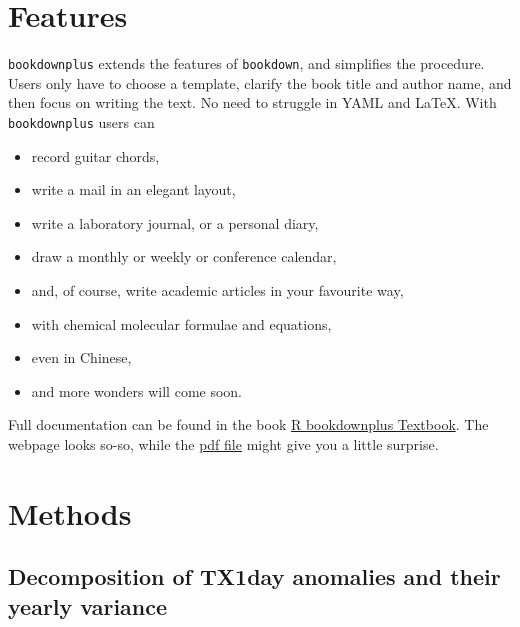 \documentclass[11pt,a4paper,twoside,openright]{report}
\theoremstyle{definition}
\numberwithin{equation}{subsection}
\begin{document}
\hypertarget{features}{%
\chapter{Features}\label{features}}

\texttt{bookdownplus} extends the features of \texttt{bookdown}, and simplifies the
procedure. Users only have to choose a template, clarify the book title and
author name, and then focus on writing the text. No need to struggle in YAML
and LaTeX.
With \texttt{bookdownplus} users can

\begin{itemize}
\item
  record guitar chords,
\item
  write a mail in an elegant layout,
\item
  write a laboratory journal, or a personal diary,
\item
  draw a monthly or weekly or conference calendar,
\item
  and, of course, write academic articles in your favourite way,
\item
  with chemical molecular formulae and equations,
\item
  even in Chinese,
\item
  and more wonders will come soon.
\end{itemize}

Full documentation can be found in the book
\href{https://bookdown.org/baydap/bookdownplus}{R bookdownplus Textbook}. The webpage
looks so-so, while the
\href{https://bookdown.org/baydap/bookdownplus/bookdownplus.pdf}{pdf file} might give
you a little surprise.

\hypertarget{methods}{%
\chapter{Methods}\label{methods}}

\hypertarget{decomposition-of-tx1day-anomalies-and-their-yearly-variance}{%
\section{Decomposition of TX1day anomalies and their yearly variance}\label{decomposition-of-tx1day-anomalies-and-their-yearly-variance}}
\end{document}
